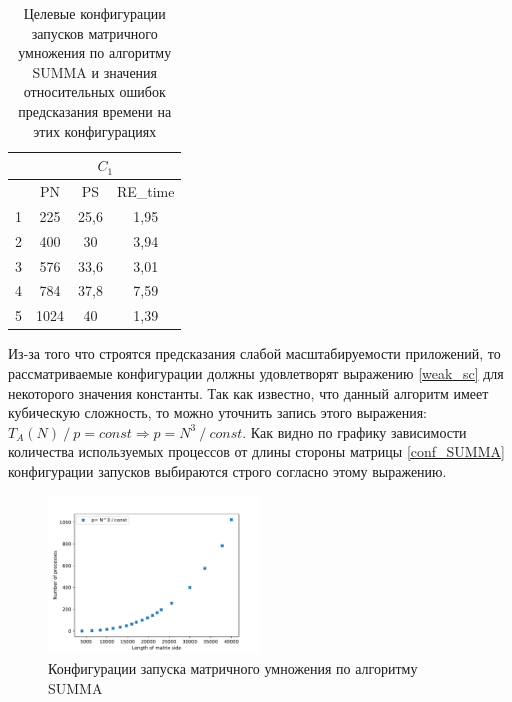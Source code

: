 		\begin{table}
			\centering
			\begin{tabular}{|r|c|c|c|}
			\hline
			            & \multicolumn{3}{|c|}{\(C_1\)} \\ \hline
			\textnumero & PN   & PS   & RE\_time        \\ \hline
			1           & 225  & 25,6 & 1,95            \\ \hline
			2           & 400  & 30   & 3,94            \\ \hline
			3           & 576  & 33,6 & 3,01            \\ \hline
			4           & 784  & 37,8 & 7,59            \\ \hline
			5           & 1024 & 40   & 1,39            \\ \hline
			\end{tabular}
			\caption{Целевые конфигурации запусков матричного умножения по алгоритму SUMMA и значения относительных ошибок предсказания времени на этих конфигурациях}
			\label{target_SUMMA}
		\end{table}
		Из-за того что строятся предсказания слабой масштабируемости приложений, то рассматриваемые конфигурации должны удовлетворят выражению \eqref{weak_sc} для некоторого значения константы. Так как известно, что данный алгоритм имеет кубическую сложность, то можно уточнить запись этого выражения: \(T_A(N)\:/\:p = const \Rightarrow p = N^3\:/\:const\). Как видно по графику зависимости количества используемых процессов от длины стороны матрицы \eqref{conf_SUMMA} конфигурации запусков выбираются строго согласно этому выражению.

		\begin{figure}
			\centering
			\includegraphics[width=0.5\textwidth]{./images/conf_SUMMA}
			\caption{Конфигурации запуска матричного умножения по алгоритму SUMMA}
			\label{conf_SUMMA}
		\end{figure}

